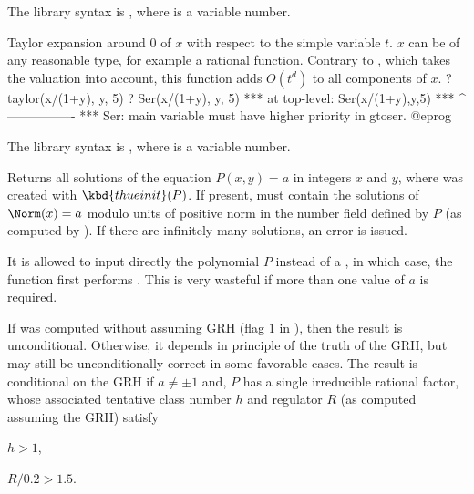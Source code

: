 The library syntax is , where  is a variable number.

\label{se:taylor}
Taylor expansion around $0$ of $x$ with respect to
the simple variable $t$. $x$ can be of any reasonable type, for example a
rational function. Contrary to , which takes the valuation into
account, this function adds $O(t^d)$ to all components of $x$.
\bprog
? taylor(x/(1+y), y, 5)
? Ser(x/(1+y), y, 5)
 ***   at top-level: Ser(x/(1+y),y,5)
 ***                 ^----------------
 *** Ser: main variable must have higher priority in gtoser.
@eprog

The library syntax is , where  is a variable number.

\label{se:thue}
Returns all solutions of the equation
$P(x,y)=a$ in integers $x$ and $y$, where  was created with
$\kbd{thueinit}(P)$. If present,  must contain the solutions of
$\Norm(x)=a$ modulo units of positive norm in the number field
defined by $P$ (as computed by ). If there are infinitely
many solutions, an error is issued.

It is allowed to input directly the polynomial $P$ instead of a ,
in which case, the function first performs . This is
very wasteful if more than one value of $a$ is required.

If  was computed without assuming GRH (flag $1$ in ),
then the result is unconditional. Otherwise, it depends in principle of the
truth of the GRH, but may still be unconditionally correct in some
favorable cases. The result is conditional on the GRH if
$a\neq \pm 1$ and, $P$ has a single irreducible rational factor, whose
associated tentative class number $h$ and regulator $R$ (as computed
assuming the GRH) satisfy

\item $h > 1$,

\item $R/0.2 > 1.5$.

